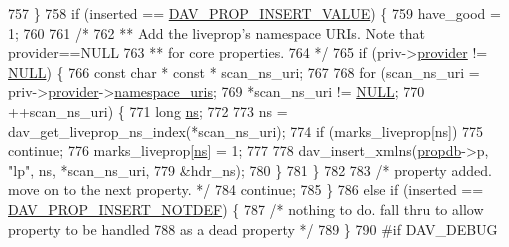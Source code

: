 \begin{DoxyCode}
757             \}
758             \textcolor{keywordflow}{if} (inserted == \hyperlink{group__MOD__DAV_gga4c0cd73bce52d0eda981ce54973f27afaac24aa1113cbab49a3fbc47398293d8f}{DAV\_PROP\_INSERT\_VALUE}) \{
759                 have\_good = 1;
760 
761                 \textcolor{comment}{/*}
762 \textcolor{comment}{                ** Add the liveprop's namespace URIs. Note that provider==NULL}
763 \textcolor{comment}{                ** for core properties.}
764 \textcolor{comment}{                */}
765                 \textcolor{keywordflow}{if} (priv->\hyperlink{structdav__elem__private_a5e9b2bd2455d88e29e87f04e495adf1c}{provider} != \hyperlink{pcre_8txt_ad7f989d16aa8ca809a36bc392c07fba1}{NULL}) \{
766                     \textcolor{keyword}{const} \textcolor{keywordtype}{char} * \textcolor{keyword}{const} * scan\_ns\_uri;
767 
768                     \textcolor{keywordflow}{for} (scan\_ns\_uri = priv->\hyperlink{structdav__elem__private_a5e9b2bd2455d88e29e87f04e495adf1c}{provider}->\hyperlink{structdav__hooks__liveprop_a7f85e5fc26d7c02d682e80c1e0ccf473}{namespace\_uris};
769                          *scan\_ns\_uri != \hyperlink{pcre_8txt_ad7f989d16aa8ca809a36bc392c07fba1}{NULL};
770                          ++scan\_ns\_uri) \{
771                         \textcolor{keywordtype}{long} \hyperlink{group__APR__Util__MC_ga5529c7c3562faf89fa1c2f6104033406}{ns};
772 
773                         ns = dav\_get\_liveprop\_ns\_index(*scan\_ns\_uri);
774                         \textcolor{keywordflow}{if} (marks\_liveprop[ns])
775                             \textcolor{keywordflow}{continue};
776                         marks\_liveprop[\hyperlink{group__APR__Util__MC_ga5529c7c3562faf89fa1c2f6104033406}{ns}] = 1;
777 
778                         dav\_insert\_xmlns(\hyperlink{group__MOD__DAV_gac428117c2c7c0121d6e49a52085fd196}{propdb}->p, \textcolor{stringliteral}{"lp"}, ns, *scan\_ns\_uri,
779                                          &hdr\_ns);
780                     \}
781                 \}
782 
783                 \textcolor{comment}{/* property added. move on to the next property. */}
784                 \textcolor{keywordflow}{continue};
785             \}
786             \textcolor{keywordflow}{else} \textcolor{keywordflow}{if} (inserted == \hyperlink{group__MOD__DAV_gga4c0cd73bce52d0eda981ce54973f27afad6c4707dbee26a2512e29fe1aac31e34}{DAV\_PROP\_INSERT\_NOTDEF}) \{
787                 \textcolor{comment}{/* nothing to do. fall thru to allow property to be handled}
788 \textcolor{comment}{                   as a dead property */}
789             \}
790 \textcolor{preprocessor}{#if DAV\_DEBUG}

\end{DoxyCode}
